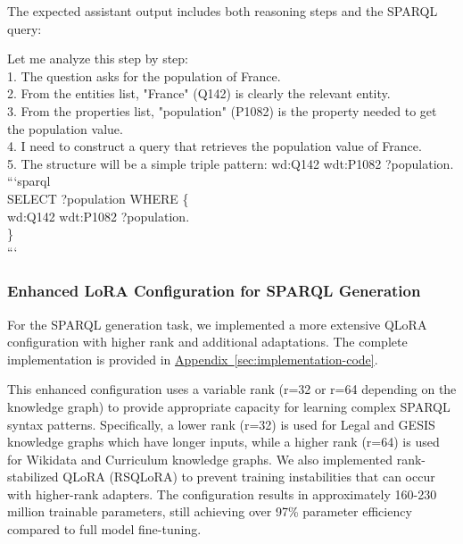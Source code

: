 The expected assistant output includes both reasoning steps and the SPARQL query:

\begin{tcolorbox}[title=SPARQL Generation Assistant Response, colback=orange!5!white, colframe=orange!75!black, boxrule=0.5mm, arc=2mm, fontupper=\ttfamily\small, breakable]
Let me analyze this step by step: \\

1. The question asks for the population of France. \\
2. From the entities list, "France" (Q142) is clearly the relevant entity. \\
3. From the properties list, "population" (P1082) is the property needed to get the population value. \\
4. I need to construct a query that retrieves the population value of France. \\
5. The structure will be a simple triple pattern: wd:Q142 wdt:P1082 ?population. \\

```sparql \\
SELECT ?population WHERE \{ \\
  wd:Q142 wdt:P1082 ?population. \\
\} \\
``` \\
\end{tcolorbox}

\subsubsection{Enhanced LoRA Configuration for SPARQL Generation}

For the SPARQL generation task, we implemented a more extensive QLoRA configuration with higher rank and additional adaptations. The complete implementation is provided in \hyperref[code:sparql-generation-lora]{Appendix~\ref{sec:implementation-code}}.

This enhanced configuration uses a variable rank (r=32 or r=64 depending on the knowledge graph) to provide appropriate capacity for learning complex SPARQL syntax patterns. Specifically, a lower rank (r=32) is used for Legal and GESIS knowledge graphs which have longer inputs, while a higher rank (r=64) is used for Wikidata and Curriculum knowledge graphs. We also implemented rank-stabilized QLoRA (RSQLoRA) to prevent training instabilities that can occur with higher-rank adapters. The configuration results in approximately 160-230 million trainable parameters, still achieving over 97\% parameter efficiency compared to full model fine-tuning.

